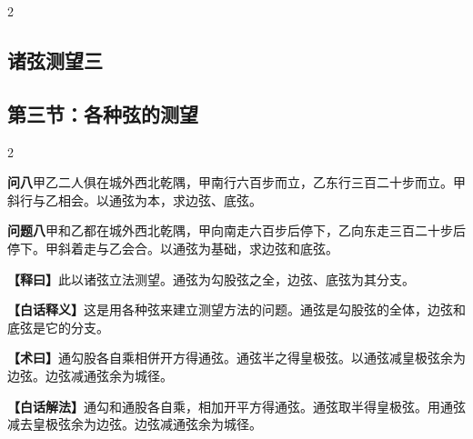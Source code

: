 \documentclass[11pt,a4paper]{article}
\newcommand{\WenQuestion}[1]{\textbf{\textcolor{classicalcolor}{#1}}}
\newcommand{\BaiQuestion}[1]{\textbf{\textcolor{moderncolor}{#1}}}
\newcommand{\WenExplain}{\textcolor{classicalcolor}{\textbf{【释曰】}}}
\newcommand{\BaiExplain}{\textcolor{moderncolor}{\textbf{【白话释义】}}}
\newcommand{\WenMethod}{\textcolor{classicalcolor}{\textbf{【术曰】}}}
\newcommand{\BaiMethod}{\textcolor{moderncolor}{\textbf{【白话解法】}}}
\begin{document}
\vspace{0.5em}

\begin{paracol}{2}
\subsection*{\textcolor{sectioncolor}{诸弦测望三}}
\switchcolumn
\subsection*{\textcolor{sectioncolor}{第三节：各种弦的测望}}
\end{paracol}

\vspace{0.5em}

\begin{paracol}{2}

\switchcolumn*
\begin{tcolorbox}[colback=red!3,colframe=red!30!black,boxrule=0.3pt]
\WenQuestion{问八}\quad 甲乙二人俱在城外西北乾隅，甲南行六百步而立，乙东行三百二十步而立。甲斜行与乙相会。以通弦为本，求边弦、底弦。
\end{tcolorbox}
\switchcolumn
\begin{tcolorbox}[colback=blue!3,colframe=blue!30!black,boxrule=0.3pt]
\BaiQuestion{问题八}\quad 甲和乙都在城外西北乾隅，甲向南走六百步后停下，乙向东走三百二十步后停下。甲斜着走与乙会合。以通弦为基础，求边弦和底弦。
\end{tcolorbox}

\switchcolumn*
\begin{tcolorbox}[colback=red!5,colframe=red!30!black,boxrule=0.3pt]
\WenExplain\quad 此以诸弦立法测望。通弦为勾股弦之全，边弦、底弦为其分支。
\end{tcolorbox}
\switchcolumn
\begin{tcolorbox}[colback=blue!5,colframe=blue!30!black,boxrule=0.3pt]
\BaiExplain\quad 这是用各种弦来建立测望方法的问题。通弦是勾股弦的全体，边弦和底弦是它的分支。
\end{tcolorbox}

\switchcolumn*
\begin{tcolorbox}[colback=red!5,colframe=red!40!black,boxrule=0.3pt]
\WenMethod\quad 通勾股各自乘相併开方得通弦。通弦半之得皇极弦。以通弦减皇极弦余为边弦。边弦减通弦余为城径。
\end{tcolorbox}
\switchcolumn
\begin{tcolorbox}[colback=blue!5,colframe=blue!40!black,boxrule=0.3pt]
\BaiMethod\quad 通勾和通股各自乘，相加开平方得通弦。通弦取半得皇极弦。用通弦减去皇极弦余为边弦。边弦减通弦余为城径。
\end{tcolorbox}


\end{paracol}
\end{document}
